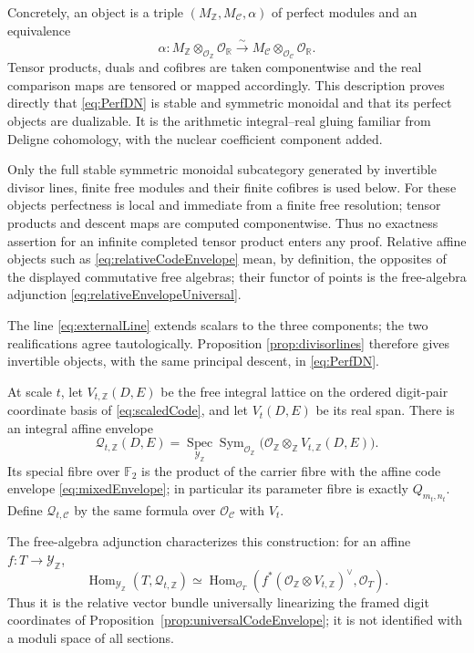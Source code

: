 \documentclass[11pt]{amsart}
\theoremstyle{definition}
\theoremstyle{remark}
\newcommand{\R}{\mathbb R}
\newcommand{\Z}{\mathbb Z}
\begin{document}
Concretely, an object is a triple $(M_{\Z},M_{\mathcal C},\alpha)$ of
perfect modules and an equivalence
\[
 \alpha:M_{\Z}\otimes_{\mathcal O_{\Z}}\mathcal O_{\R}
 \xrightarrow{\sim}
 M_{\mathcal C}\otimes_{\mathcal O_{\mathcal C}}\mathcal O_{\R}.
\]
Tensor products, duals and cofibres are taken componentwise and the real
comparison maps are tensored or mapped accordingly.  This description
proves directly that \eqref{eq:PerfDN} is stable and symmetric monoidal and
that its perfect objects are dualizable.  It is the arithmetic
integral--real gluing familiar from Deligne cohomology, with the nuclear
coefficient component added.

Only the full stable symmetric monoidal subcategory generated by invertible
divisor lines, finite free modules and their finite cofibres is used below.
For these objects perfectness is local and immediate from a finite free
resolution; tensor products and descent maps are computed componentwise.
Thus no exactness assertion for an infinite completed tensor product enters
any proof.  Relative affine objects such as
\eqref{eq:relativeCodeEnvelope} mean, by definition, the opposites of the
displayed commutative free algebras; their functor of points is the
free-algebra adjunction \eqref{eq:relativeEnvelopeUniversal}.

The line \eqref{eq:externalLine} extends scalars to the three components;
the two realifications agree tautologically.  Proposition
\ref{prop:divisorlines} therefore gives invertible objects, with the same
principal descent, in \eqref{eq:PerfDN}.

At scale $t$, let $V_{t,\Z}(D,E)$ be the free integral lattice on the
ordered digit-pair coordinate basis of \eqref{eq:scaledCode}, and let
$V_t(D,E)$ be its real span.  There is an integral affine envelope
\begin{equation}\label{eq:relativeCodeEnvelope}
 \mathcal Q_{t,\Z}(D,E)=
 \underset{\mathscr Y_{\Z}}{\operatorname{Spec}}
 \operatorname{Sym}_{\mathcal O_{\Z}}
 \bigl(\mathcal O_{\Z}\otimes_{\Z}V_{t,\Z}(D,E)\bigr).
\end{equation}
Its special fibre over $\mathbb F_2$ is the product of the carrier fibre
with the affine code envelope \eqref{eq:mixedEnvelope}; in particular its
parameter fibre is exactly $Q_{m_t,n_t}$.  Define
$\mathcal Q_{t,\mathcal C}$ by the same
formula over $\mathcal O_{\mathcal C}$ with $V_t$.

The free-algebra adjunction characterizes this construction: for an affine
$f:T\to\mathscr Y_{\Z}$,
\begin{equation}\label{eq:relativeEnvelopeUniversal}
 \operatorname{Hom}_{\mathscr Y_{\Z}}(T,\mathcal Q_{t,\Z})
 \simeq
 \operatorname{Hom}_{\mathcal O_T}
 (f^*(\mathcal O_{\Z}\otimes V_{t,\Z})^\vee,\mathcal O_T).
\end{equation}
Thus it is the relative vector bundle universally linearizing the framed
digit coordinates of Proposition~\ref{prop:universalCodeEnvelope}; it is
not identified with a moduli space of all sections.
\end{document}
